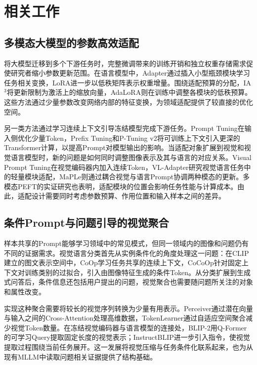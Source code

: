 \section{相关工作}

\subsection{多模态大模型的参数高效适配}

将大模型迁移到多个下游任务时，完整微调带来的训练开销和独立权重存储需求促使研究者缩小参数更新范围。在语言模型中，Adapter通过插入小型瓶颈模块学习任务相关变换\cite{houlsby2019parameter}，LoRA进一步以低秩矩阵表示权重增量\cite{Hu2022LoRA}。围绕适配预算的分配，IA$^3$将更新限制为激活上的缩放向量\cite{Liu2022FewShotPF}，AdaLoRA则在训练中调整各模块的低秩预算\cite{Zhang2023AdaLoRAAB}。这些方法通过少量参数改变网络内部的特征变换，为领域适配提供了较直接的优化空间。

另一类方法通过学习连续上下文引导冻结模型完成下游任务。Prompt Tuning在输入侧优化少量Token\cite{lester2021power}，Prefix Tuning和P-Tuning v2将可训练上下文引入更深的Transformer计算，以提高Prompt对模型输出的影响\cite{li2021prefix,Liu2021PTuningVP}。当适配对象扩展到视觉和视觉语言模型时，新的问题是如何同时调整图像表示及其与语言的对应关系。Visual Prompt Tuning在视觉编码器内加入连续Token\cite{jia2022visual}，VL-Adapter研究视觉语言任务中的轻量模块适配\cite{sung2021vl}，MaPLe则通过耦合视觉与语言Prompt协调两种模态的更新\cite{Khattak2022MaPLeMP}。多模态PEFT的实证研究也表明，适配模块的位置会影响任务性能与计算成本\cite{zhou2024empirical}。由此，适配设计需要同时考虑参数预算、作用位置和输入样本之间的差异。

\subsection{条件Prompt与问题引导的视觉聚合}

样本共享的Prompt能够学习领域中的常见模式，但同一领域内的图像和问题仍有不同的证据需求。视觉语言分类首先从实例条件化的角度处理这一问题：在CLIP建立的图文表示空间中\cite{Radford2021LearningTV}，CoOp学习任务共享的连续上下文\cite{Zhou2021LearningTP}，CoCoOp针对固定上下文对训练类别的过拟合，引入由图像特征生成的条件Token\cite{Zhou2022ConditionalPL}。从分类扩展到生成式问答后，条件信息还包括用户提出的问题，视觉聚合也需要随问题所关注的对象和属性改变。

实现这种聚合需要将较长的视觉序列转换为少量有用表示。Perceiver通过潜在向量与输入之间的Cross-Attention处理高维数据\cite{Jaegle2021PerceiverGP}，TokenLearner通过自适应空间聚合减少视觉Token数量\cite{Ryoo2021TokenLearnerWC}。在冻结视觉编码器与语言模型的连接处，BLIP-2用Q-Former的可学习Query提取固定长度的视觉表示\cite{li2023blip}；InstructBLIP进一步引入指令，使视觉提取过程围绕当前任务展开\cite{dai2023instructblip}。这一发展将视觉压缩与任务条件化联系起来，也为从现有MLLM中读取问题相关证据提供了结构基础。

